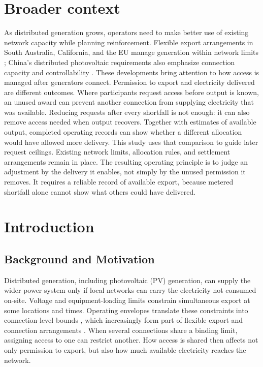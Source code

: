 \documentclass[twoside,twocolumn,9pt]{article}
\begin{document}
\section*{Broader context}
As distributed generation grows, operators need to make better use of existing
network capacity while planning reinforcement. Flexible export arrangements
in South Australia, California, and the EU manage generation within network
limits \cite{sapn2024dapr,cpuc2022e5230,eu2024flexibleconnections}; China's
distributed photovoltaic requirements also emphasize connection capacity and
controllability \cite{nea2025distributedpv}. These developments bring attention
to how access is managed after generators connect. Permission to export
and electricity delivered are different outcomes. Where participants request
access before output is known, an unused award can prevent another connection
from supplying electricity that was available. Reducing requests after every
shortfall is not enough: it can also remove access needed when output recovers.
Together with estimates of available output, completed operating records can
show whether a different allocation would have allowed more delivery. This
study uses that comparison to guide later request ceilings. Existing network limits,
allocation rules, and settlement arrangements remain in place. The resulting
operating principle is to judge an adjustment by the delivery it enables,
not simply by the unused permission it removes. It requires a reliable record
of available export, because metered shortfall alone cannot show what others
could have delivered.

\section{Introduction}
\label{sec:introduction}
\subsection{Background and Motivation}

Distributed generation, including photovoltaic (PV) generation, can supply the
wider power system only if local networks can carry the electricity not
consumed on-site. Voltage and equipment-loading limits constrain simultaneous
export at some locations and times. Operating envelopes translate these
constraints into connection-level bounds
\cite{petrou2021dynamiclimits,liu2022opfenvelopes,hoque2024doemarket}, which
increasingly form part of flexible export and connection arrangements
\cite{sapn2024dapr,cpuc2022e5230,eu2024flexibleconnections,nea2025distributedpv}.
When several connections share a binding limit, assigning access to one can
restrict another. How access is shared then affects not only permission to
export, but also how much available electricity reaches the network.
\end{document}
